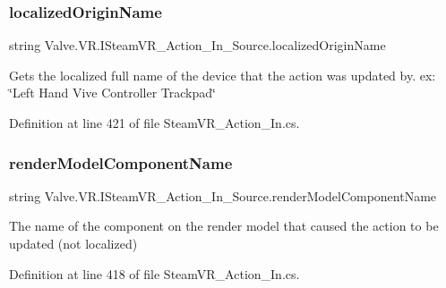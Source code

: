 \subsubsection{\texorpdfstring{localizedOriginName}{localizedOriginName}}
{\footnotesize\ttfamily string Valve.\+V\+R.\+I\+Steam\+V\+R\+\_\+\+Action\+\_\+\+In\+\_\+\+Source.\+localized\+Origin\+Name\hspace{0.3cm}{\ttfamily [get]}}



Gets the localized full name of the device that the action was updated by. ex\+: \char`\"{}\+Left Hand Vive Controller Trackpad\char`\"{} 



Definition at line 421 of file Steam\+V\+R\+\_\+\+Action\+\_\+\+In.\+cs.

\mbox{\label{interface_valve_1_1_v_r_1_1_i_steam_v_r___action___in___source_aed8fb392a34de9c8840578c4a3f6a9ba}} 
\subsubsection{\texorpdfstring{renderModelComponentName}{renderModelComponentName}}
{\footnotesize\ttfamily string Valve.\+V\+R.\+I\+Steam\+V\+R\+\_\+\+Action\+\_\+\+In\+\_\+\+Source.\+render\+Model\+Component\+Name\hspace{0.3cm}{\ttfamily [get]}}



The name of the component on the render model that caused the action to be updated (not localized) 



Definition at line 418 of file Steam\+V\+R\+\_\+\+Action\+\_\+\+In.\+cs.

\mbox{\label{interface_valve_1_1_v_r_1_1_i_steam_v_r___action___in___source_a5dbae568b5daf1cfd3b529b00750caae}} 
